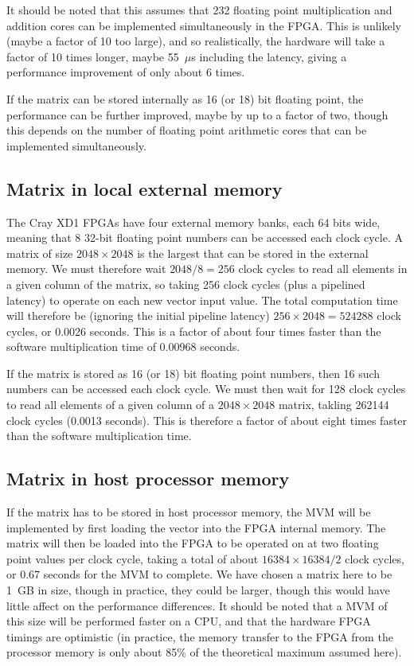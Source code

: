 \documentclass{article}
\begin{document}
It should be noted that this assumes that 232 floating point
multiplication and addition cores can be implemented simultaneously in
the FPGA.  This is unlikely (maybe a factor of 10 too large), and so
realistically, the hardware will take a factor of 10 times longer,
maybe 55~$\mu$s including the latency, giving a performance
improvement of only about 6 times.   

If the matrix can be stored internally as 16 (or 18) bit floating
point, the performance can be further improved, maybe by up to a
factor of two, though this depends on the number of floating point
arithmetic cores that can be implemented simultaneously.

\subsection{Matrix in local external memory}
The Cray XD1 FPGAs have four external memory banks, each 64 bits wide,
meaning that 8 32-bit floating point numbers can be accessed each
clock cycle.  A matrix of size $2048\times2048$ is the largest that
can be stored in the external memory.  We must therefore wait
$2048/8=256$ clock cycles to read all elements in a given column of
the matrix, so taking 256 clock cycles (plus a pipelined latency) to
operate on each new vector input value.  The total computation time
will therefore be (ignoring the initial pipeline latency)
$256\times2048=524288$ clock cycles, or 0.0026 seconds.  This is a
factor of about four times faster than the software multiplication
time of 0.00968 seconds.

If the matrix is stored as 16 (or 18) bit floating point numbers, then
16 such numbers can be accessed each clock cycle.  We must then wait
for 128 clock cycles to read all elements of a given column of a
$2048\times2048$ matrix, takling 262144 clock cycles (0.0013
seconds).  This is therefore a factor of about eight times faster than
the software multiplication time.

\subsection{Matrix in host processor memory}
If the matrix has to be stored in host processor memory, the MVM will
be implemented by first loading the vector into the FPGA internal
memory.  The matrix will then be loaded into the FPGA to be operated
on at two floating point values per clock cycle, taking a total of
about $16384\times16384/2$ clock cycles, or 0.67 seconds for the MVM
to complete.  We have chosen a matrix here to be 1~GB in size, though
in practice, they could be larger, though this would have little
affect on the performance differences.  It should be noted that a MVM
of this size will be performed faster on a CPU, and that the hardware
FPGA timings are optimistic (in practice, the memory transfer to the
FPGA from the processor memory is only about 85\% of the theoretical
maximum assumed here).  
\end{document}
